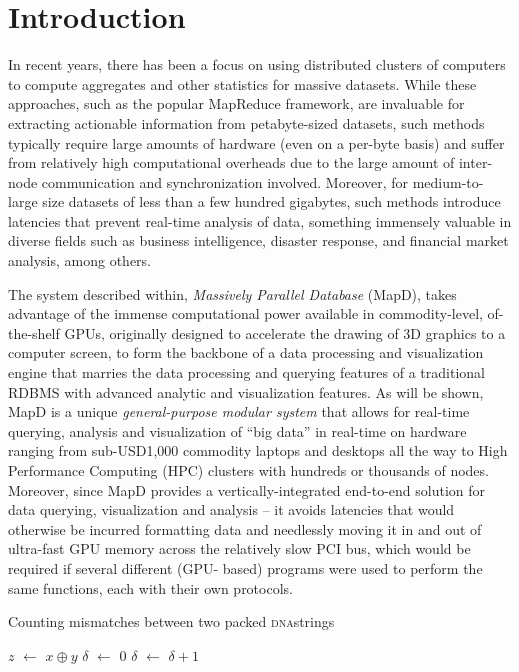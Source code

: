 \documentclass[twocolumn]{article}
\newcommand*\DNA{\textsc{dna}}
\newcommand*\Let[2]{\State #1 $\gets$ #2}
\begin{document}
\section{Introduction}
In recent years, there has been a focus on using distributed clusters of computers to compute aggregates and other statistics for massive datasets. 
While these approaches, such as the popular MapReduce framework, are invaluable for extracting actionable information from petabyte-sized datasets, such methods typically require large amounts of hardware (even on a per-byte basis) and suffer from relatively high computational overheads due to the large amount of inter-node communication and synchronization involved. 
Moreover, for medium-to-large size datasets of less than a few hundred gigabytes, such methods introduce latencies that prevent real-time analysis of data, something immensely valuable in diverse fields such as business intelligence, disaster response, and financial market analysis, among others.

The system described within, \textit{Massively Parallel Database} (MapD), takes advantage of the immense computational power available in commodity-level, of-the-shelf GPUs, originally designed to accelerate the drawing of 3D graphics to a computer screen, to form the backbone of a data processing and visualization engine that marries the data processing and querying features of a traditional RDBMS with advanced analytic and visualization features. 
As will be shown, MapD is a unique \textit{general-purpose modular system} that allows for real-time querying, analysis and visualization of “big data” in real-time on hardware ranging from sub-USD1,000 commodity laptops and desktops all the way to High Performance Computing (HPC) clusters with hundreds or thousands of nodes. Moreover, since MapD provides a vertically-integrated end-to-end solution for data querying, visualization and analysis – it avoids latencies that would otherwise be incurred formatting data and needlessly moving it in and out of ultra-fast GPU memory across the relatively slow PCI bus, which would be required if several different (GPU- based) programs were used to perform the same functions, each with their own protocols.

\begin{algorithm}[H]
  \caption{Counting mismatches between two packed \DNA strings 
  \label{alg:packed-dna-hamming}}
  \begin{algorithmic}[1]
    \Require{$x$ and $y$ are packed \DNA strings of equal length $n$}
    \Statex
      \Let{$z$}{$x \oplus y$} 
      \Let{$\delta$}{$0$}
          \Let{$\delta$}{$\delta + 1$}
        \EndIf
      \EndFor
      \State \Return{$\delta$}
  \end{algorithmic}
\end{algorithm}
\end{document}
